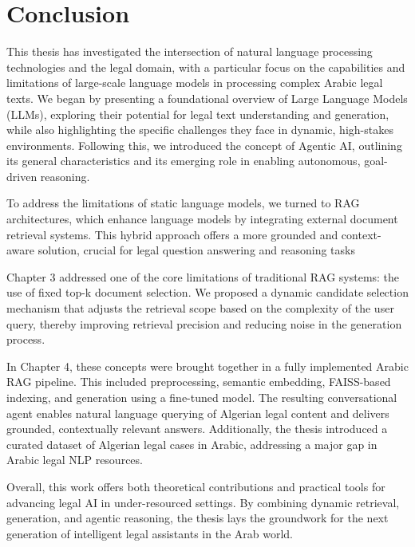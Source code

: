 \chapter*{Conclusion}
\pagestyle{fancy}
\pagestyle{fancy}\chead{} \pagestyle{fancy}\rhead{}
\pagestyle{fancy}\cfoot{} \pagestyle{fancy}\rfoot{\thepage}
This thesis has investigated the intersection of natural language processing technologies and the legal domain, with a particular focus on the capabilities and limitations of large-scale language models in processing complex Arabic legal texts. We began by presenting a foundational overview of Large Language Models (LLMs), exploring their potential for legal text understanding and generation, while also highlighting the specific challenges they face in dynamic, high-stakes environments. Following this, we introduced the concept of Agentic AI, outlining its general characteristics and its emerging role in enabling autonomous, goal-driven reasoning.

To address the limitations of static language models, we turned to RAG architectures, which enhance language models by integrating external document retrieval systems. This hybrid approach offers a more grounded and context-aware solution, crucial for legal question answering and reasoning tasks

Chapter 3 addressed one of the core limitations of traditional RAG systems: the use of fixed top-k document selection. We proposed a dynamic candidate selection mechanism that adjusts the retrieval scope based on the complexity of the user query, thereby improving retrieval precision and reducing noise in the generation process.

In Chapter 4, these concepts were brought together in a fully implemented Arabic RAG pipeline. This included preprocessing, semantic embedding, FAISS-based indexing, and generation using a fine-tuned model. The resulting conversational agent enables natural language querying of Algerian legal content and delivers grounded, contextually relevant answers. Additionally, the thesis introduced a curated dataset of Algerian legal cases in Arabic, addressing a major gap in Arabic legal NLP resources.

Overall, this work offers both theoretical contributions and practical tools for advancing legal AI in under-resourced settings. By combining dynamic retrieval, generation, and agentic reasoning, the thesis lays the groundwork for the next generation of intelligent legal assistants in the Arab world.







